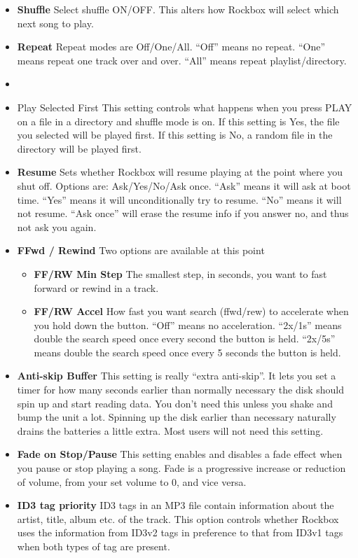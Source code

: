 \begin{itemize}
\item \textbf{Shuffle}
Select shuffle ON/OFF. This alters how Rockbox will select which next
song to play. 
\item \textbf{Repeat}
Repeat modes are Off/One/All. ``Off'' means no
repeat. ``One'' means repeat one track over
and over. ``All'' means repeat playlist/directory. 
\item \item{Play Selected First }
This setting controls what happens when you press PLAY on a file in a
directory and shuffle mode is on. If this setting is Yes, the file you
selected will be played first. If this setting is No, a random file in
the directory will be played first. 
\item \textbf{Resume}
Sets whether Rockbox will resume playing at the point where you shut
off. Options are: Ask/Yes/No/Ask once.
``Ask'' means it will ask at boot time. ``Yes'' means it will unconditionally try to resume. ``No'' means it will not resume. ``Ask once'' will erase the resume info if you answer no, and thus not ask you again.
\item \textbf{FFwd / Rewind}
Two options are available at this point

\begin{itemize}
\item \textbf{FF/RW Min Step}
The smallest step, in seconds, you want to fast forward or rewind in a
track.
\item \textbf{FF/RW Accel}
How fast you want search (ffwd/rew) to accelerate when you hold
down the button. ``Off'' means no acceleration. ``2x/1s'' means double the
search speed once every second the button is held. ``2x/5s'' means double the search speed once every 5 seconds the button is held.
\end{itemize}

\item \textbf{Anti{}-skip Buffer}
This setting is really ``extra anti{}-skip''. It lets you set
a timer for how many seconds earlier than normally necessary the disk
should spin up and start reading data. You don't need
this unless you shake and bump the unit a lot. Spinning up the disk
earlier than necessary naturally drains the batteries a little extra. 
Most users will not need this setting.

\item \textbf{Fade on Stop/Pause}
This setting enables and disables a fade effect when you pause
or stop playing a song. Fade is a progressive increase or reduction of
volume, from your set volume to 0, and vice versa.

\item \textbf{ID3 tag priority}
ID3 tags in an MP3 file contain information about the artist, title,
album etc. of the track.  This option controls whether Rockbox uses the information from ID3v2 tags in preference to that from ID3v1 tags when both types of tag are present.
\end{itemize}

